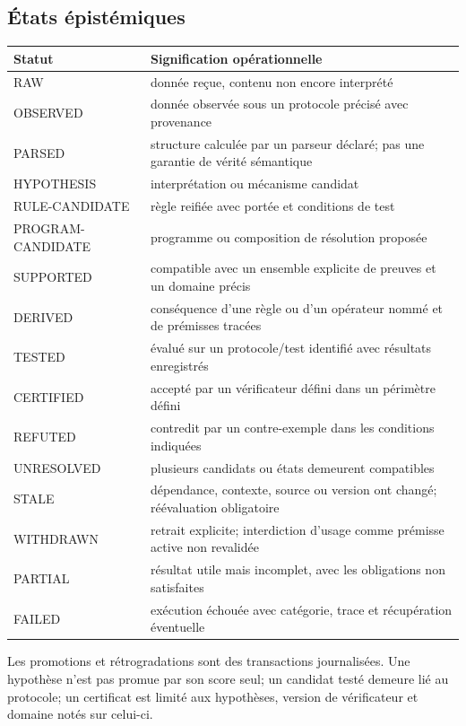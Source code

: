 \documentclass[11pt,a4paper]{article}
\newcommand{\State}[1]{\textsf{#1}}
\begin{document}
\subsection{États épistémiques}
\begin{longtable}{p{}p{}}
\toprule Statut & Signification opérationnelle \\
\midrule
\State{RAW} & donnée reçue, contenu non encore interprété \\
\State{OBSERVED} & donnée observée sous un protocole précisé avec provenance \\
\State{PARSED} & structure calculée par un parseur déclaré; pas une garantie de vérité sémantique \\
\State{HYPOTHESIS} & interprétation ou mécanisme candidat \\
\State{RULE-CANDIDATE} & règle reifiée avec portée et conditions de test \\
\State{PROGRAM-CANDIDATE} & programme ou composition de résolution proposée \\
\State{SUPPORTED} & compatible avec un ensemble explicite de preuves et un domaine précis \\
\State{DERIVED} & conséquence d'une règle ou d'un opérateur nommé et de prémisses tracées \\
\State{TESTED} & évalué sur un protocole/test identifié avec résultats enregistrés \\
\State{CERTIFIED} & accepté par un vérificateur défini dans un périmètre défini \\
\State{REFUTED} & contredit par un contre-exemple dans les conditions indiquées \\
\State{UNRESOLVED} & plusieurs candidats ou états demeurent compatibles \\
\State{STALE} & dépendance, contexte, source ou version ont changé; réévaluation obligatoire \\
\State{WITHDRAWN} & retrait explicite; interdiction d'usage comme prémisse active non revalidée \\
\State{PARTIAL} & résultat utile mais incomplet, avec les obligations non satisfaites \\
\State{FAILED} & exécution échouée avec catégorie, trace et récupération éventuelle \\
\bottomrule
\end{longtable}
Les promotions et rétrogradations sont des transactions journalisées. Une hypothèse n'est pas promue par son score seul; un candidat testé demeure lié au protocole; un certificat est limité aux hypothèses, version de vérificateur et domaine notés sur celui-ci.
\end{document}
